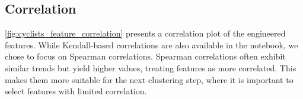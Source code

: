 \subsection{Correlation}

\autoref{fig:cyclists_feature_correlation} presents a correlation plot of the engineered features. While Kendall-based correlations are also available in the notebook, we chose to focus on Spearman correlations. Spearman correlations often exhibit similar trends but yield higher values, treating features as more correlated. This makes them more suitable for the next clustering step, where it is important to select features with limited correlation.

